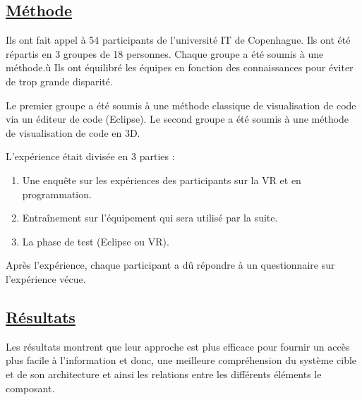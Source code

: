 \documentclass[a4paper,10pt, oneside]{article}
\newcommand{\li}{\newline}
\begin{document}
\subsection{\ul{Méthode}}
        \par Ils ont fait appel à 54 participants de l'université IT de Copenhague. Ils ont été répartis en 3 groupes de 18 personnes. Chaque groupe a été soumis à une méthode.ù
        Ils ont équilibré les équipes en fonction des connaissances pour éviter de trop grande disparité.\li
        \par Le premier groupe a été soumis à une méthode classique de visualisation de code via un éditeur de code (Eclipse). Le second groupe a été soumis à une méthode de visualisation de code en 3D.\li
        \par L'expérience était divisée en 3 parties : 
        \begin{enumerate}
            \item Une enquête sur les expériences des participants sur la VR et en programmation.
            \item Entraînement sur l'équipement qui sera utilisé par la suite.
            \item La phase de test (Eclipse ou VR).
        \end{enumerate}
        \par Après l'expérience, chaque participant a dû répondre à un questionnaire sur l'expérience vécue.
\subsection{\ul{Résultats}}
        \par Les résultats montrent que leur approche est plus efficace pour fournir un accès plus facile à l'information et donc, une meilleure compréhension
        du système cible et de son architecture et ainsi les relations entre les différents éléments le composant.


 
\end{document}
